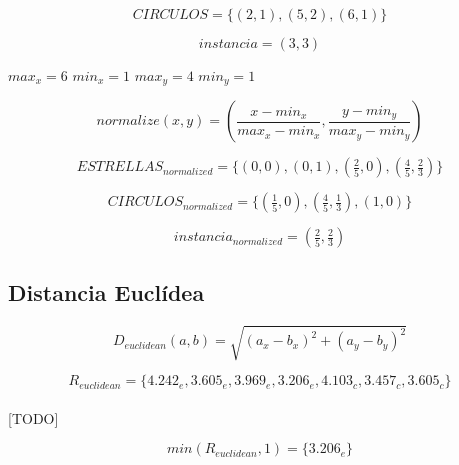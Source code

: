 \documentclass{article}
\begin{document}
		\begin{equation}
		\label{eq:circulos}
			CIRCULOS  = \{(2,1), (5,2), (6,1)\}
		\end{equation}

		\begin{equation}
		\label{eq:instancia}
			instancia  = (3,3)
		\end{equation}

		$max_x = 6$ $min_x = 1$ $max_y = 4$ $min_y = 1$


		\begin{equation}
		\label{eq:normalization}
			normalize(x,y) = (\frac{x-min_x}{max_x-min_x},\frac{y-min_y}{max_y-min_y})
		\end{equation}


		\begin{equation}
		\label{eq:estrellas_normalized}
			ESTRELLAS_{normalized} = \{(0,0), (0,1), (\tfrac{2}{5},0), (\tfrac{4}{5},\tfrac{2}{3})\}
		\end{equation}

		\begin{equation}
		\label{eq:circulos_normalized}
			CIRCULOS_{normalized}  = \{(\tfrac{1}{5},0), (\tfrac{4}{5},\tfrac{1}{3}), (1,0)\}
		\end{equation}

		\begin{equation}
		\label{eq:instancia_normalized}
			instancia_{normalized}  = (\tfrac{2}{5},\tfrac{2}{3})
		\end{equation}

		\subsection{Distancia Euclídea}


			\begin{equation}
				D_{euclidean}(a,b) = \sqrt{(a_x - b_x)^2 + (a_y - b_y)^2}
			\end{equation}

			\begin{equation}
				R_{euclidean} = \{4.242_e, 3.605_e, 3.969_e, 3.206_e, 4.103_c, 3.457_c, 3.605_c\}
			\end{equation}

			\paragraph{}
			[TODO]

			\begin{equation}
				min(R_{euclidean},1) = \{ 3.206_e \}
			\end{equation}
\end{document}
